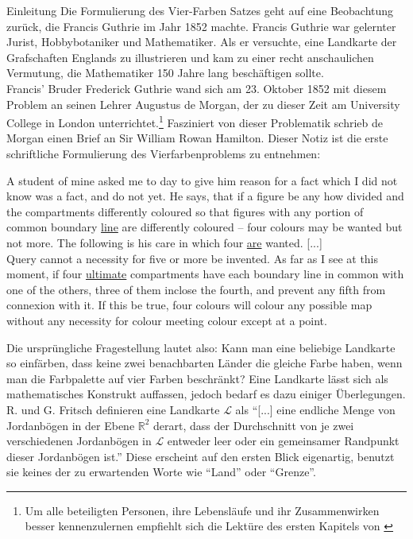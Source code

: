 \begin{chapter}{Einleitung}
 Die Formulierung des Vier-Farben Satzes geht auf eine Beobachtung zurück, die Francis Guthrie im Jahr 1852 machte. Francis Guthrie war gelernter Jurist, Hobbybotaniker und Mathematiker. Als er versuchte, eine Landkarte der Grafschaften Englands zu illustrieren und kam zu einer recht anschaulichen Vermutung, die Mathematiker 150 Jahre lang beschäftigen sollte. \\
 Francis' Bruder Frederick Guthrie wand sich am 23. Oktober 1852 mit diesem Problem an seinen Lehrer Augustus de Morgan, der zu dieser Zeit am University College in London unterrichtet.\footnote{Um alle beteiligten Personen, ihre Lebensläufe und ihr Zusammenwirken besser kennenzulernen empfiehlt sich die Lektüre des ersten Kapitels von \cite{fritsch}} Fasziniert von dieser Problematik schrieb de Morgan einen Brief an Sir William Rowan Hamilton. Dieser Notiz ist die erste schriftliche Formulierung des Vierfarbenproblems zu entnehmen:
 
 \begin{satz}
  A student of mine asked me to day to give him reason for a fact which I did not know was a fact, and do not yet. He says, that if a figure be any how divided and the compartments differently coloured so that figures with any portion of common boundary \underline{line} are differently coloured -- four colours may be wanted but not more. The following is his care in which four \underline{are} wanted. [...]\\
  Query cannot a necessity for five or more be invented. As far as I see at this moment, if four \underline{ultimate} compartments have each boundary line in common with one of the others, three of them inclose the fourth, and prevent any fifth from connexion with it. If this be true, four colours will colour any possible map without any necessity for colour meeting colour except at a point.  \cite{fritsch}
 \end{satz}
 
 Die ursprüngliche Fragestellung lautet also: Kann man eine beliebige Landkarte so einfärben, dass keine zwei benachbarten Länder die gleiche Farbe haben, wenn man die Farbpalette auf vier Farben beschränkt? Eine Landkarte lässt sich als mathematisches Konstrukt auffassen, jedoch bedarf es dazu einiger Überlegungen. R. und G. Fritsch definieren eine Landkarte $\mathcal{L}$ als ``[...] eine endliche Menge von Jordanbögen in der Ebene $\mathbb{R}^2$ derart, dass der Durchschnitt von je zwei verschiedenen Jordanbögen in $\mathcal{L}$ entweder leer oder ein gemeinsamer Randpunkt dieser Jordanbögen ist.'' \cite{fritsch} Diese erscheint auf den ersten Blick eigenartig, benutzt sie keines der zu erwartenden Worte wie ``Land'' oder ``Grenze''. 
 

\end{chapter}
